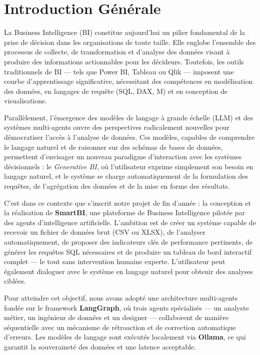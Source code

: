 \chapter*{Introduction Générale}

La Business Intelligence (BI) constitue aujourd'hui un pilier fondamental de la prise de décision dans les organisations de toute taille. Elle englobe l'ensemble des processus de collecte, de transformation et d'analyse des données visant à produire des informations actionnables pour les décideurs. Toutefois, les outils traditionnels de BI --- tels que Power BI, Tableau ou Qlik --- imposent une courbe d'apprentissage significative, nécessitant des compétences en modélisation des données, en langages de requête (SQL, DAX, M) et en conception de visualisations.

Parallèlement, l'émergence des modèles de langage à grande échelle (LLM) et des systèmes multi-agents ouvre des perspectives radicalement nouvelles pour démocratiser l'accès à l'analyse de données. Ces modèles, capables de comprendre le langage naturel et de raisonner sur des schémas de bases de données, permettent d'envisager un nouveau paradigme d'interaction avec les systèmes décisionnels : le \textit{Generative BI}, où l'utilisateur exprime simplement son besoin en langage naturel, et le système se charge automatiquement de la formulation des requêtes, de l'agrégation des données et de la mise en forme des résultats.

C'est dans ce contexte que s'inscrit notre projet de fin d'année : la conception et la réalisation de \textbf{SmartBI}, une plateforme de Business Intelligence pilotée par des agents d'intelligence artificielle. L'ambition est de créer un système capable de recevoir un fichier de données brut (CSV ou XLSX), de l'analyser automatiquement, de proposer des indicateurs clés de performance pertinents, de générer les requêtes SQL nécessaires et de produire un tableau de bord interactif complet --- le tout sans intervention humaine experte. L'utilisateur peut également dialoguer avec le système en langage naturel pour obtenir des analyses ciblées.

Pour atteindre cet objectif, nous avons adopté une architecture multi-agents fondée sur le framework \textbf{LangGraph}, où trois agents spécialisés --- un analyste métier, un ingénieur de données et un designer --- collaborent de manière séquentielle avec un mécanisme de rétroaction et de correction automatique d'erreurs. Les modèles de langage sont exécutés localement via \textbf{Ollama}, ce qui garantit la souveraineté des données et une latence acceptable.

